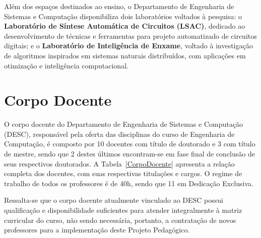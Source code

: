 Além dos espaços destinados ao ensino, o Departamento de Engenharia de Sistemas e Computação disponibiliza dois laboratórios voltados à pesquisa: o \textbf{Laboratório de Síntese Automática de Circuitos (LSAC)}, dedicado ao desenvolvimento de técnicas e ferramentas para projeto automatizado de circuitos digitais; e o \textbf{Laboratório de Inteligência de Enxame}, voltado à investigação de algoritmos inspirados em sistemas naturais distribuídos, com aplicações em otimização e inteligência computacional.

\section{Corpo Docente}

O corpo docente do Departamento de Engenharia de Sistemas e Computação (DESC), responsável pela oferta das disciplinas do curso de Engenharia de Computação, é composto por 10 docentes com título de doutorado e 3 com título de mestre, sendo que 2 destes últimos encontram-se em fase final de conclusão de seus respectivos doutorados. A Tabela~\ref{CorpoDocente} apresenta a relação completa dos docentes, com suas respectivas titulações e cargos. O regime de trabalho de todos os professores é de 40h, sendo que 11 em Dedicação Exclusiva.

Ressalta-se que o corpo docente atualmente vinculado ao DESC possui qualificação e disponibilidade suficientes para atender integralmente à matriz curricular do curso, não sendo necessária, portanto, a contratação de novos professores para a implementação deste Projeto Pedagógico.

